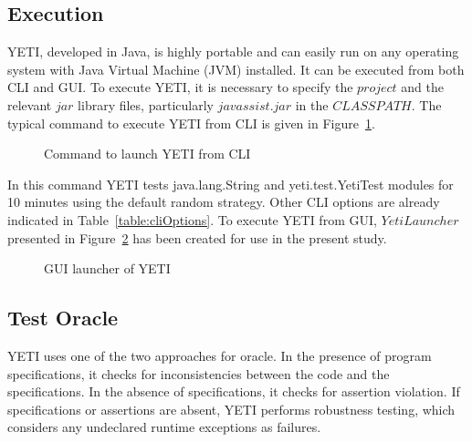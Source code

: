\subsection{Execution}
YETI, developed in Java, is highly portable and can easily run on any operating system with Java Virtual Machine (JVM) installed. It can be executed from both CLI and GUI. To execute YETI, it is necessary to specify the $project$ and the relevant $jar$ library files, particularly $javassist.jar$ in the $CLASSPATH$. The typical command to execute YETI from CLI is given in Figure~\ref{fig:yeticommand}.
\smallskip
\begin{figure}[H]
	\centering
	\smallskip
	\caption{Command to launch YETI from CLI}
	\label{fig:yeticommand}
\end{figure}
\smallskip
In this command YETI tests java.lang.String and yeti.test.YetiTest modules for 10 minutes using the default random strategy. Other CLI options are already indicated in Table~\ref{table:cliOptions}. To execute YETI from GUI, $YetiLauncher$ presented in Figure~\ref{fig:yetiLauncher} has been created for use in the present study.
\bigskip
\begin{figure}[H]
	\centering
	\smallskip
	\caption{GUI launcher of YETI}
	\label{fig:yetiLauncher}
\end{figure}


\subsection{Test Oracle}
YETI uses one of the two approaches for oracle. In the presence of program specifications, it checks for inconsistencies between the code and the specifications. In the absence of specifications, it checks for assertion violation.%
If specifications or assertions are absent, YETI performs robustness testing, which considers any undeclared runtime exceptions as failures. 

